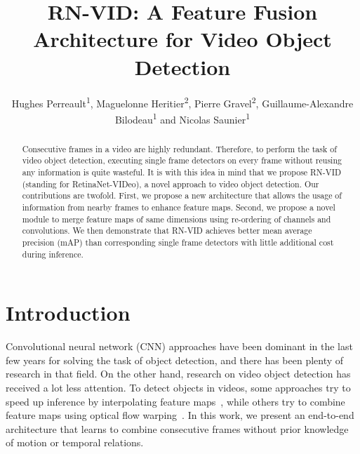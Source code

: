 \documentclass[runningheads]{llncs}
\begin{document}
\title{RN-VID: A Feature Fusion Architecture for Video Object Detection}
\author{Hughes Perreault\textsuperscript{1}, Maguelonne Heritier\textsuperscript{2}, Pierre Gravel\textsuperscript{2}, Guillaume-Alexandre Bilodeau\textsuperscript{1} and Nicolas Saunier\textsuperscript{1}}
\maketitle              \begin{abstract}
Consecutive frames in a video are highly redundant. Therefore, to perform the task of video object detection, executing single frame detectors on every frame without reusing any information is quite wasteful. It is with this idea in mind that we propose RN-VID (standing for RetinaNet-VIDeo), a novel approach to video object detection. Our contributions are twofold. First, we propose a new architecture that allows the usage of information from nearby frames to enhance feature maps. Second, we propose a novel module to merge feature maps of same dimensions using re-ordering of channels and  convolutions. We then demonstrate that RN-VID achieves better mean average precision (mAP) than corresponding single frame detectors with little additional cost during inference.

\end{abstract}
\section{Introduction}
Convolutional neural network (CNN) approaches have been dominant in the last few years for solving the task of object detection, and there has been plenty of research in that field. On the other hand, research on video object detection has received a lot less attention. To detect objects in videos, some approaches try to speed up inference by interpolating feature maps~\cite{Liu_2018_CVPR}, while others try to combine feature maps using optical flow warping~\cite{zhu2017flow}. In this work, we present an end-to-end architecture that learns to combine consecutive frames without prior knowledge of motion or temporal relations. 
\end{document}
